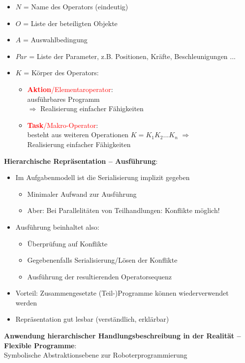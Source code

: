 \begin{itemize}
\item $N$ = Name des Operators (eindeutig)
\item $O$ = Liste der beteiligten Objekte
\item $A$ = Auswahlbedingung
\item $Par$ = Liste der Parameter, z.B. Positionen, Kräfte, Beschleunigungen ...
\item $K$ = Körper des Operators:
\begin{itemize}
\item \textcolor{red}{\textbf{Aktion}/Elementaroperator}:\\ ausführbares Programm\\ $\Rightarrow$ Realisierung einfacher Fähigkeiten
\item \textcolor{red}{\textbf{Task}/Makro-Operator}:\\ besteht aus weiteren Operationen $K = K_1K_2...K_n$ $\Rightarrow$\\ Realisierung einfacher Fähigkeiten
\end{itemize}
\end{itemize}
\textbf{Hierarchische Repräsentation -- Ausführung}:
\begin{itemize}
\item Im Aufgabenmodell ist die Serialisierung implizit gegeben
\begin{itemize}
\item Minimaler Aufwand zur Ausführung
\item Aber: Bei Parallelitäten von Teilhandlungen: Konflikte möglich!
\end{itemize}
\item Ausführung beinhaltet also:
\begin{itemize}
\item Überprüfung auf Konflikte
\item Gegebenenfalls Serialisierung/Lösen der Konflikte
\item Ausführung der resultierenden Operatorsequenz
\end{itemize}
\item Vorteil: Zusammengesetzte (Teil-)Programme können wiederverwendet werden
\item Repräsentation gut \glqq lesbar\grqq{} (verständlich, erklärbar)
\end{itemize}
\textbf{Anwendung hierarchischer Handlungsbeschreibung in der Realität -- Flexible Programme}:\\
Symbolische Abstraktionsebene zur Roboterprogrammierung
